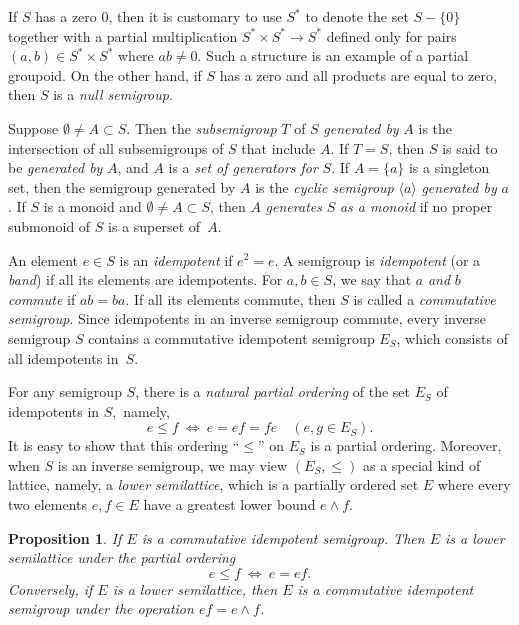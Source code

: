 \documentclass{surv-l}
\numberwithin{equation}{section}
\numberwithin{table}{section}
\numberwithin{figure}{section}
\newtheorem{proposition}[equation]{Proposition}
\theoremstyle{definition}
\begin{document}
If $S$ has a zero $0$, then it is customary to use $S^{\ast}$ to
denote the set $S-\{0\}$ together with a partial multiplication
$S^{\ast}\times S^{\ast}\rightarrow S^{\ast}$ defined only for
pairs $(a,b)\in S^{\ast}\times S^{\ast}$ where $ab\neq 0$. Such a
structure is an example of a partial groupoid. On the other
hand, if $S$ has a zero and all products are equal to zero, then
$S$ is a \emph{null semigroup}.

Suppose $\emptyset\neq A\subset S$. Then the \emph{subsemigroup}
$T$ of $S$ \emph{generated by} $A$ is the
intersection of all subsemigroups of $S$ that include $A$. If
$T=S$, then $S$ is said to be \emph{generated by} $A$, and $A$ is a
\emph{set of generators for} $S$. If $A=\{a\}$ is a singleton
set, then the semigroup generated by $A$ is the \emph{cyclic
semigroup} $\langle a\rangle$ \emph{generated by} $a$. If $S$ is a monoid and
$\emptyset\neq A\subset S$, then $A$ \emph{generates} $S$ \emph{as
a monoid} if no proper submonoid of $S$ is a superset of~$A$.

An element $e\in S$ is an \emph{idempotent} if $e^{2}=e$. A
semigroup is \emph{idempotent} (or a
\emph{band}) if all its elements are idempotents. For
$a, b\in S$, we say that $a$ \emph{and} $b$ \emph{commute} if
$ab=ba$. If all its elements commute, then $S$ is called a
\emph{commutative semigroup}. Since
idempotents in an inverse semigroup commute, every inverse
semigroup $S$ contains a commutative idempotent semigroup $E_{S}$,
which consists of all idempotents in~$S$.

For any semigroup $S$, there is a \emph{natural partial
ordering} of the set $E_{S}$ of
idempotents in $S$,~namely,
\[
e\leq f\ \Leftrightarrow\ e=ef=fe\quad (e, g\in E_{S}).
\]
It is easy to show that this ordering ``$\leq$'' on $E_{S}$ is a
partial ordering. Moreover, when $S$ is an inverse semigroup, we
may view $(E_{S}, \leq)$ as a special kind of lattice, namely, a
\emph{lower semilattice}, which is a partially ordered set $E$
where every two elements $e, f\in E$ have a greatest lower bound
$e\wedge f$.

\begin{proposition}\label{propA.75.1}
If $E$ is a commutative idempotent
semigroup. Then $E$ is a lower
semilattice under the partial ordering
\[
e\leq f\ \Leftrightarrow\ e=ef.
\]
Conversely, if $E$ is a lower semilattice, then $E$ is a
commutative idempotent semigroup under the operation
$ef=e\wedge f$.
\end{proposition}
\end{document}
